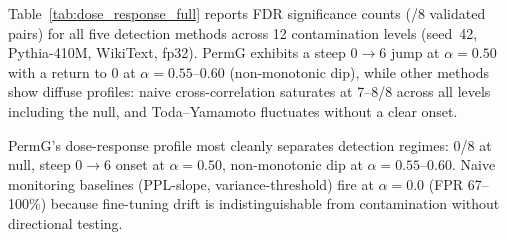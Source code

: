 Table~\ref{tab:dose_response_full} reports FDR significance counts (/8 validated pairs) for all five detection methods across 12 contamination levels (seed~42, Pythia-410M, WikiText, fp32).
PermG exhibits a steep 0$\to$6 jump at $\alpha{=}0.50$ with a return to 0 at $\alpha{=}0.55$--$0.60$ (non-monotonic dip), while other methods show diffuse profiles: naive cross-correlation saturates at 7--8/8 across all levels including the null, and Toda--Yamamoto fluctuates without a clear onset.

\begin{table}[H]
\centering
\small
\caption{Per-method FDR significance (/8 pairs) across contamination levels (Pythia-410M, seed~42, WikiText, fp32). PermG and Diff.\ XCorr use BH-corrected FDR ($q{=}0.05$); Naive XCorr, Threshold, and TY use uncorrected $p{<}0.05$ (no FDR field in pipeline). $\alpha{=}1.0$ from Pythia-410M cross-architecture condition (same seed/domain/precision).}
\label{tab:dose_response_full}
\end{table}

PermG's dose-response profile most cleanly separates detection regimes: 0/8 at null, steep 0$\to$6 onset at $\alpha{=}0.50$, non-monotonic dip at $\alpha{=}0.55$--$0.60$.
Naive monitoring baselines (PPL-slope, variance-threshold) fire at $\alpha{=}0.0$ (FPR 67--100\%) because fine-tuning drift is indistinguishable from contamination without directional testing.

